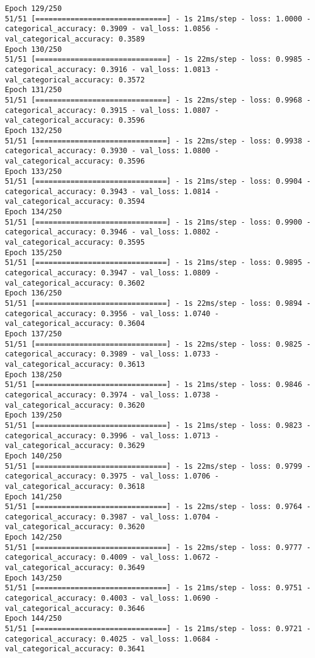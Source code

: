 \begin{lstlisting}
Epoch 129/250
51/51 [==============================] - 1s 21ms/step - loss: 1.0000 - categorical_accuracy: 0.3909 - val_loss: 1.0856 - val_categorical_accuracy: 0.3589
Epoch 130/250
51/51 [==============================] - 1s 22ms/step - loss: 0.9985 - categorical_accuracy: 0.3916 - val_loss: 1.0813 - val_categorical_accuracy: 0.3572
Epoch 131/250
51/51 [==============================] - 1s 22ms/step - loss: 0.9968 - categorical_accuracy: 0.3915 - val_loss: 1.0807 - val_categorical_accuracy: 0.3596
Epoch 132/250
51/51 [==============================] - 1s 22ms/step - loss: 0.9938 - categorical_accuracy: 0.3930 - val_loss: 1.0800 - val_categorical_accuracy: 0.3596
Epoch 133/250
51/51 [==============================] - 1s 21ms/step - loss: 0.9904 - categorical_accuracy: 0.3943 - val_loss: 1.0814 - val_categorical_accuracy: 0.3594
Epoch 134/250
51/51 [==============================] - 1s 21ms/step - loss: 0.9900 - categorical_accuracy: 0.3946 - val_loss: 1.0802 - val_categorical_accuracy: 0.3595
Epoch 135/250
51/51 [==============================] - 1s 21ms/step - loss: 0.9895 - categorical_accuracy: 0.3947 - val_loss: 1.0809 - val_categorical_accuracy: 0.3602
Epoch 136/250
51/51 [==============================] - 1s 22ms/step - loss: 0.9894 - categorical_accuracy: 0.3956 - val_loss: 1.0740 - val_categorical_accuracy: 0.3604
Epoch 137/250
51/51 [==============================] - 1s 22ms/step - loss: 0.9825 - categorical_accuracy: 0.3989 - val_loss: 1.0733 - val_categorical_accuracy: 0.3613
Epoch 138/250
51/51 [==============================] - 1s 21ms/step - loss: 0.9846 - categorical_accuracy: 0.3974 - val_loss: 1.0738 - val_categorical_accuracy: 0.3620
Epoch 139/250
51/51 [==============================] - 1s 21ms/step - loss: 0.9823 - categorical_accuracy: 0.3996 - val_loss: 1.0713 - val_categorical_accuracy: 0.3629
Epoch 140/250
51/51 [==============================] - 1s 22ms/step - loss: 0.9799 - categorical_accuracy: 0.3975 - val_loss: 1.0706 - val_categorical_accuracy: 0.3618
Epoch 141/250
51/51 [==============================] - 1s 22ms/step - loss: 0.9764 - categorical_accuracy: 0.3987 - val_loss: 1.0704 - val_categorical_accuracy: 0.3620
Epoch 142/250
51/51 [==============================] - 1s 22ms/step - loss: 0.9777 - categorical_accuracy: 0.4009 - val_loss: 1.0672 - val_categorical_accuracy: 0.3649
Epoch 143/250
51/51 [==============================] - 1s 21ms/step - loss: 0.9751 - categorical_accuracy: 0.4003 - val_loss: 1.0690 - val_categorical_accuracy: 0.3646
Epoch 144/250
51/51 [==============================] - 1s 21ms/step - loss: 0.9721 - categorical_accuracy: 0.4025 - val_loss: 1.0684 - val_categorical_accuracy: 0.3641

\end{lstlisting}
